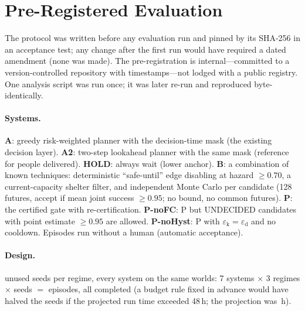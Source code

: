 \documentclass[letterpaper]{article}
\newcommand{\epsd}{\varepsilon_{\mathrm{d}}}
\newcommand{\epsk}{\varepsilon_{\mathrm{k}}}
\begin{document}
\section{Pre-Registered Evaluation}

The protocol was written before any evaluation run and pinned by its SHA-256 in an acceptance test; any
change after the first run would have required a dated amendment (none was made). The pre-registration is
internal---committed to a version-controlled repository with timestamps---not lodged with a public
registry. One analysis script was run once; it was later re-run and reproduced byte-identically.

\paragraph{Systems.} \textbf{A}: greedy risk-weighted planner with the decision-time mask (the existing
decision layer). \textbf{A2}: two-step lookahead planner with the same mask (reference for people
delivered). \textbf{HOLD}: always wait (lower anchor). \textbf{B}: a combination of known techniques:
deterministic ``safe-until'' edge disabling at hazard $\ge0.70$, a current-capacity shelter filter, and
independent Monte Carlo per candidate (128 futures, accept if mean joint success $\ge0.95$; no bound, no
common futures). \textbf{P}: the certified gate with re-certification. \textbf{P-noFC}: P but
UNDECIDED candidates with point estimate $\ge0.95$ are allowed. \textbf{P-noHyst}: P with
$\epsk=\epsd$ and no cooldown. Episodes run without a human (automatic acceptance).

\paragraph{Design.} \nSeedsPerRegime{} unused seeds per regime, every system on the same worlds:
7 systems $\times$ 3 regimes $\times$ \nSeedsPerRegime{} seeds $=$ \nEpisodesTotal{} episodes, all
completed (a budget rule fixed in advance would have halved the seeds if the projected run time
exceeded 48\,h; the projection was \nBudgetHours\,h).
\end{document}
